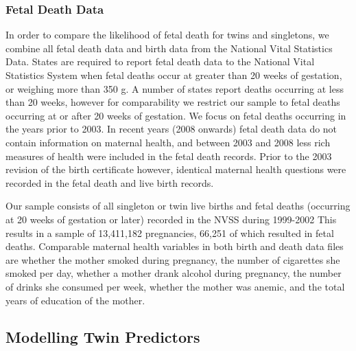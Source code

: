 \documentclass{nature}
\begin{document}
\begin{linenumbers}
\subsubsection{Fetal Death Data}
In order to compare the likelihood of fetal death for twins and singletons, we combine all fetal death data and birth data from the National Vital Statistics Data.   States are required to report fetal death data to the National Vital Statistics System when fetal deaths occur at greater than 20 weeks of gestation, or weighing more than 350 g. A number of states report deaths occurring at less than 20 weeks, however for comparability we restrict our sample to fetal deaths occurring at or after 20 weeks of gestation.  We focus on fetal deaths occurring in the years prior to 2003.  In recent years (2008 onwards) fetal death data do not contain information on maternal health, and between 2003 and 2008 less rich measures of health were included in the fetal death records.  Prior to the 2003 revision of the birth certificate however, identical maternal health questions were recorded in the fetal death and live birth records.

Our sample consists of all singleton or twin live births and fetal deaths (occurring at 20 weeks of gestation or later) recorded in the NVSS during 1999-2002  This results in a sample of 13,411,182 pregnancies, 66,251 of which resulted in fetal deaths.  Comparable maternal health variables in both birth and death data files are whether the mother smoked during pregnancy, the number of cigarettes she smoked per day, whether a mother drank alcohol during pregnancy, the number of drinks she consumed per week, whether the mother was anemic, and the total years of education of the mother.

\subsection{Modelling Twin Predictors}



\end{linenumbers}
\end{document}
